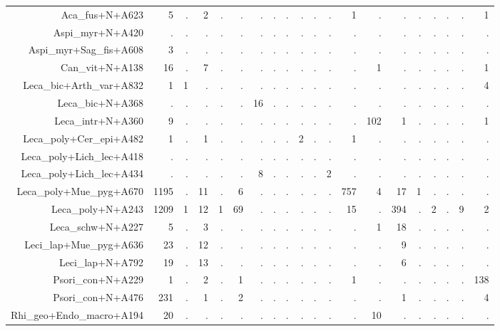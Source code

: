 \documentclass[a4paper, 11]{article}\usepackage[]{graphicx}\usepackage[]{color}
\begin{document}
\begin{table}
\begin{tabular}{rrrrrrrrrrrrrrrrrrrr}
  \hline
Aca\_fus+N+A623 & 5 & . & 2 & . & . & . & . & . & . & . & . & 1 & . & . & . & . & . & . & 1 \\ 
  Aspi\_myr+N+A420 & . & . & . & . & . & . & . & . & . & . & . & . & . & . & . & . & . & . & . \\ 
  Aspi\_myr+Sag\_fis+A608 & 3 & . & . & . & . & . & . & . & . & . & . & . & . & . & . & . & . & . & . \\ 
  Can\_vit+N+A138 & 16 & . & 7 & . & . & . & . & . & . & . & . & . & 1 & . & . & . & . & . & 1 \\ 
  Leca\_bic+Arth\_var+A832 & 1 & 1 & . & . & . & . & . & . & . & . & . & . & . & . & . & . & . & . & 4 \\ 
  Leca\_bic+N+A368 & . & . & . & . & . & 16 & . & . & . & . & . & . & . & . & . & . & . & . & . \\ 
  Leca\_intr+N+A360 & 9 & . & . & . & . & . & . & . & . & . & . & . & 102 & 1 & . & . & . & . & 1 \\ 
  Leca\_poly+Cer\_epi+A482 & 1 & . & 1 & . & . & . & . & . & 2 & . & . & 1 & . & . & . & . & . & . & . \\ 
  Leca\_poly+Lich\_lec+A418 & . & . & . & . & . & . & . & . & . & . & . & . & . & . & . & . & . & . & . \\ 
  Leca\_poly+Lich\_lec+A434 & . & . & . & . & . & 8 & . & . & . & . & 2 & . & . & . & . & . & . & . & . \\ 
  Leca\_poly+Mue\_pyg+A670 & 1195 & . & 11 & . & 6 & . & . & . & . & . & . & 757 & 4 & 17 & 1 & . & . & . & . \\ 
  Leca\_poly+N+A243 & 1209 & 1 & 12 & 1 & 69 & . & . & . & . & . & . & 15 & . & 394 & . & 2 & . & 9 & 2 \\ 
  Leca\_schw+N+A227 & 5 & . & 3 & . & . & . & . & . & . & . & . & . & 1 & 18 & . & . & . & . & . \\ 
  Leci\_lap+Mue\_pyg+A636 & 23 & . & 12 & . & . & . & . & . & . & . & . & . & . & 9 & . & . & . & . & . \\ 
  Leci\_lap+N+A792 & 19 & . & 13 & . & . & . & . & . & . & . & . & . & . & 6 & . & . & . & . & . \\ 
  Psori\_con+N+A229 & 1 & . & 2 & . & 1 & . & . & . & . & . & . & 1 & . & . & . & . & . & . & 138 \\ 
  Psori\_con+N+A476 & 231 & . & 1 & . & 2 & . & . & . & . & . & . & . & . & 1 & . & . & . & . & 4 \\ 
  Rhi\_geo+Endo\_macro+A194 & 20 & . & . & . & . & . & . & . & . & . & . & . & 10 & . & . & . & . & . & . \\ 

\end{tabular}
\end{table}
\end{document}
